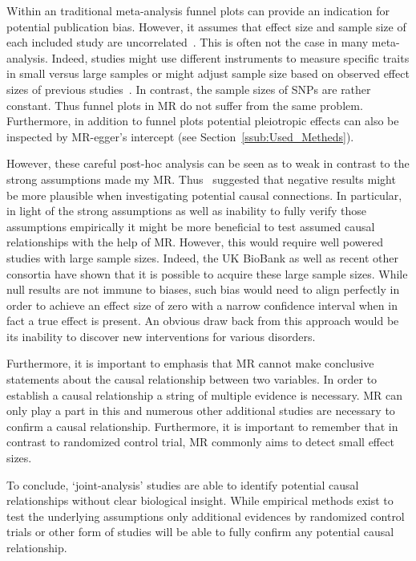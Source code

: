 Within an traditional meta-analysis funnel plots can provide an indication for potential publication bias.
However, it assumes that effect size and sample size of each included study are uncorrelated~\cite{Evans2013}.
This is often not the case in many meta-analysis.
Indeed, studies might use different instruments to measure specific traits in small versus large samples or  might adjust sample size based on observed effect sizes of previous studies~\cite{Simonsohn}.
In contrast, the sample sizes of SNPs are rather constant.
Thus funnel plots in MR do not suffer from the same problem.
Furthermore, in addition to funnel plots potential pleiotropic effects can also be inspected by MR-egger's intercept (see Section~\ref{ssub:Used_Metheds}).

However, these careful post-hoc analysis can be seen as to weak in contrast to the strong assumptions made my MR\@. 
Thus~\citet{Vanderweele2015} suggested that negative results might be more plausible when investigating potential causal connections.
In particular, in light of the strong assumptions as well as inability to fully verify those assumptions empirically it might be more beneficial to test assumed causal relationships with the help of MR\@.
However, this would require well powered studies with large sample sizes.
Indeed, the UK BioBank as well as recent other consortia have shown that it is possible to acquire these large sample sizes.
While null results are not immune to biases, such bias would need to align perfectly in order to achieve an effect size of zero with a narrow confidence interval when in fact a true effect is present.
An obvious draw back from this approach would be its inability to discover new interventions for various disorders. 

Furthermore, it is important to emphasis that MR cannot make conclusive statements about the causal relationship between two variables.
In order to establish a causal relationship a string of multiple evidence is necessary.
MR can only play a part in this and numerous other additional studies are necessary to confirm a causal relationship.
Furthermore, it is important to remember that in contrast to randomized control trial, MR commonly aims to detect small effect sizes.

To conclude, `joint-analysis' studies are able to identify potential causal relationships without clear biological insight.
While empirical methods exist to test the underlying assumptions only additional evidences by randomized control trials or other form of studies will be able to fully confirm any potential causal relationship.

